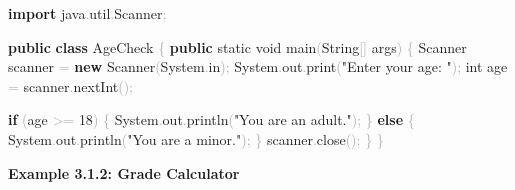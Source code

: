 \documentclass[
  justified,
  openright,
]{tufte-book}
\newcommand{\KeywordTok}[1]{\textcolor{CodeKeyword}{\textbf{#1}}}  %
\newcommand{\StringTok}[1]{\textcolor{CodeString}{#1}}              %
\newcommand{\CodeNumTok}[1]{\textcolor{CodeNumber}{#1}}             %
\newcommand{\CodeFuncTok}[1]{\textcolor{CodeKeyword}{#1}}           %
\newcommand{\CodeTypeTok}[1]{\textcolor{CodeType}{#1}}              %
\newcommand{\CodeAccentTok}[1]{\textcolor{CodeAccent}{#1}}          %
\newcommand{\OperatorTok}[1]{\textcolor{DarkGray}{#1}}              %
\newenvironment{Shaded}{%
  \begin{mdframed}[style=TufteCode]%
}{%
  \end{mdframed}%
}
\begin{document}
\begin{Shaded}
\begin{Highlighting}[]
\KeywordTok{import} \CodeAccentTok{java}\OperatorTok{.}\CodeAccentTok{util}\OperatorTok{.}\CodeAccentTok{Scanner}\OperatorTok{;}
 
\KeywordTok{public} \KeywordTok{class} AgeCheck \OperatorTok{\{}
    \KeywordTok{public} \CodeTypeTok{static} \CodeTypeTok{void} \CodeFuncTok{main}\OperatorTok{(}String\OperatorTok{[]} args\OperatorTok{)} \OperatorTok{\{}
        Scanner scanner \OperatorTok{=} \KeywordTok{new} Scanner\OperatorTok{(}System\OperatorTok{.}\CodeFuncTok{in}\OperatorTok{);}
        System\OperatorTok{.}\CodeFuncTok{out}\OperatorTok{.}\CodeFuncTok{print}\OperatorTok{(}\StringTok{"Enter your age: "}\OperatorTok{);}
        \CodeTypeTok{int} age \OperatorTok{=} scanner\OperatorTok{.}\CodeFuncTok{nextInt}\OperatorTok{();}
 
        \KeywordTok{if} \OperatorTok{(}age \OperatorTok{\textgreater{}=} \CodeNumTok{18}\OperatorTok{)} \OperatorTok{\{}
            System\OperatorTok{.}\CodeFuncTok{out}\OperatorTok{.}\CodeFuncTok{println}\OperatorTok{(}\StringTok{"You are an adult."}\OperatorTok{);}
        \OperatorTok{\}} \KeywordTok{else} \OperatorTok{\{}
            System\OperatorTok{.}\CodeFuncTok{out}\OperatorTok{.}\CodeFuncTok{println}\OperatorTok{(}\StringTok{"You are a minor."}\OperatorTok{);}
        \OperatorTok{\}}
        scanner\OperatorTok{.}\CodeFuncTok{close}\OperatorTok{();}
    \OperatorTok{\}}
\OperatorTok{\}}
\end{Highlighting}
\end{Shaded}

\textbf{Example 3.1.2: Grade Calculator}
\end{document}
